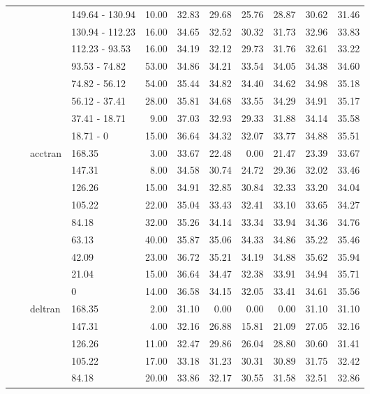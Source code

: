 \begin{longtable}{llllrrrrrrr}
   &  &  & 149.64 - 130.94 & 10.00 & 32.83 & 29.68 & 25.76 & 28.87 & 30.62 & 31.46 \\ 
   &  &  & 130.94 - 112.23 & 16.00 & 34.65 & 32.52 & 30.32 & 31.73 & 32.96 & 33.83 \\ 
   &  &  & 112.23 - 93.53 & 16.00 & 34.19 & 32.12 & 29.73 & 31.76 & 32.61 & 33.22 \\ 
   &  &  & 93.53 - 74.82 & 53.00 & 34.86 & 34.21 & 33.54 & 34.05 & 34.38 & 34.60 \\ 
   &  &  & 74.82 - 56.12 & 54.00 & 35.44 & 34.82 & 34.40 & 34.62 & 34.98 & 35.18 \\ 
   &  &  & 56.12 - 37.41 & 28.00 & 35.81 & 34.68 & 33.55 & 34.29 & 34.91 & 35.17 \\ 
   &  &  & 37.41 - 18.71 & 9.00 & 37.03 & 32.93 & 29.33 & 31.88 & 34.14 & 35.58 \\ 
   &  &  & 18.71 - 0 & 15.00 & 36.64 & 34.32 & 32.07 & 33.77 & 34.88 & 35.51 \\ 
   &  & acctran & 168.35 & 3.00 & 33.67 & 22.48 & 0.00 & 21.47 & 23.39 & 33.67 \\ 
   &  &  & 147.31 & 8.00 & 34.58 & 30.74 & 24.72 & 29.36 & 32.02 & 33.46 \\ 
   &  &  & 126.26 & 15.00 & 34.91 & 32.85 & 30.84 & 32.33 & 33.20 & 34.04 \\ 
   &  &  & 105.22 & 22.00 & 35.04 & 33.43 & 32.41 & 33.10 & 33.65 & 34.27 \\ 
   &  &  & 84.18 & 32.00 & 35.26 & 34.14 & 33.34 & 33.94 & 34.36 & 34.76 \\ 
   &  &  & 63.13 & 40.00 & 35.87 & 35.06 & 34.33 & 34.86 & 35.22 & 35.46 \\ 
   &  &  & 42.09 & 23.00 & 36.72 & 35.21 & 34.19 & 34.88 & 35.62 & 35.94 \\ 
   &  &  & 21.04 & 15.00 & 36.64 & 34.47 & 32.38 & 33.91 & 34.94 & 35.71 \\ 
   &  &  & 0 & 14.00 & 36.58 & 34.15 & 32.05 & 33.41 & 34.61 & 35.56 \\ 
   &  & deltran & 168.35 & 2.00 & 31.10 & 0.00 & 0.00 & 0.00 & 31.10 & 31.10 \\ 
   &  &  & 147.31 & 4.00 & 32.16 & 26.88 & 15.81 & 21.09 & 27.05 & 32.16 \\ 
   &  &  & 126.26 & 11.00 & 32.47 & 29.86 & 26.04 & 28.80 & 30.60 & 31.41 \\ 
   &  &  & 105.22 & 17.00 & 33.18 & 31.23 & 30.31 & 30.89 & 31.75 & 32.42 \\ 
   &  &  & 84.18 & 20.00 & 33.86 & 32.17 & 30.55 & 31.58 & 32.51 & 32.86 \\ 

\end{longtable}
